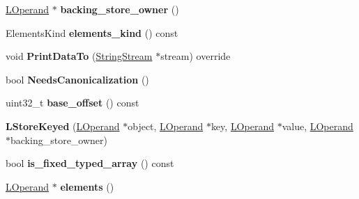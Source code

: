 \begin{DoxyCompactItemize}
\item 
\hyperlink{classv8_1_1internal_1_1_l_operand}{L\+Operand} $\ast$ {\bfseries backing\+\_\+store\+\_\+owner} ()\hypertarget{classv8_1_1internal_1_1_l_store_keyed_a21d192f5ddd6bbb5198880a6e2d03db3}{}\label{classv8_1_1internal_1_1_l_store_keyed_a21d192f5ddd6bbb5198880a6e2d03db3}

\item 
Elements\+Kind {\bfseries elements\+\_\+kind} () const \hypertarget{classv8_1_1internal_1_1_l_store_keyed_a09fd8ff5055daa16ec86a8f9bf4a1388}{}\label{classv8_1_1internal_1_1_l_store_keyed_a09fd8ff5055daa16ec86a8f9bf4a1388}

\item 
void {\bfseries Print\+Data\+To} (\hyperlink{classv8_1_1internal_1_1_string_stream}{String\+Stream} $\ast$stream) override\hypertarget{classv8_1_1internal_1_1_l_store_keyed_a6904d9c0c8c7e81ec9aab35f73978d38}{}\label{classv8_1_1internal_1_1_l_store_keyed_a6904d9c0c8c7e81ec9aab35f73978d38}

\item 
bool {\bfseries Needs\+Canonicalization} ()\hypertarget{classv8_1_1internal_1_1_l_store_keyed_a638212d8d0abef68447e1451b452ac14}{}\label{classv8_1_1internal_1_1_l_store_keyed_a638212d8d0abef68447e1451b452ac14}

\item 
uint32\+\_\+t {\bfseries base\+\_\+offset} () const \hypertarget{classv8_1_1internal_1_1_l_store_keyed_aa88021608606f53948b262edeccda1e6}{}\label{classv8_1_1internal_1_1_l_store_keyed_aa88021608606f53948b262edeccda1e6}

\item 
{\bfseries L\+Store\+Keyed} (\hyperlink{classv8_1_1internal_1_1_l_operand}{L\+Operand} $\ast$object, \hyperlink{classv8_1_1internal_1_1_l_operand}{L\+Operand} $\ast$key, \hyperlink{classv8_1_1internal_1_1_l_operand}{L\+Operand} $\ast$value, \hyperlink{classv8_1_1internal_1_1_l_operand}{L\+Operand} $\ast$backing\+\_\+store\+\_\+owner)\hypertarget{classv8_1_1internal_1_1_l_store_keyed_a40acd77f50898d8601b8587509f6443f}{}\label{classv8_1_1internal_1_1_l_store_keyed_a40acd77f50898d8601b8587509f6443f}

\item 
bool {\bfseries is\+\_\+fixed\+\_\+typed\+\_\+array} () const \hypertarget{classv8_1_1internal_1_1_l_store_keyed_a9e741b26eae820e0effc84187cef9fd1}{}\label{classv8_1_1internal_1_1_l_store_keyed_a9e741b26eae820e0effc84187cef9fd1}

\item 
\hyperlink{classv8_1_1internal_1_1_l_operand}{L\+Operand} $\ast$ {\bfseries elements} ()\hypertarget{classv8_1_1internal_1_1_l_store_keyed_a65b49dc68849be2f341b9f6db3399248}{}\label{classv8_1_1internal_1_1_l_store_keyed_a65b49dc68849be2f341b9f6db3399248}


\end{DoxyCompactItemize}
